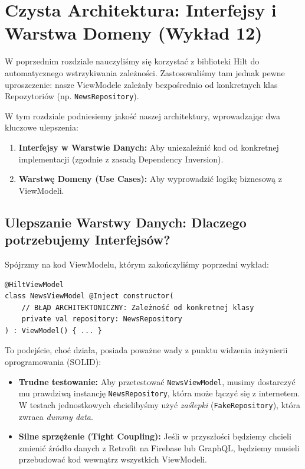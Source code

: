 \chapter{Czysta Architektura: Interfejsy i Warstwa Domeny (Wykład 12)}

W poprzednim rozdziale nauczyliśmy się korzystać z biblioteki Hilt do automatycznego wstrzykiwania zależności. Zastosowaliśmy tam jednak pewne uproszczenie: nasze ViewModele zależały bezpośrednio od konkretnych klas Repozytoriów (np. \texttt{NewsRepository}).

W tym rozdziale podniesiemy jakość naszej architektury, wprowadzając dwa kluczowe ulepszenia:
\begin{enumerate}
    \item \textbf{Interfejsy w Warstwie Danych:} Aby uniezależnić kod od konkretnej implementacji (zgodnie z zasadą Dependency Inversion).
    \item \textbf{Warstwę Domeny (Use Cases):} Aby wyprowadzić logikę biznesową z ViewModeli.
\end{enumerate}

\section{Ulepszanie Warstwy Danych: Dlaczego potrzebujemy Interfejsów?}

Spójrzmy na kod ViewModelu, którym zakończyliśmy poprzedni wykład:

\begin{verbatim}
@HiltViewModel
class NewsViewModel @Inject constructor(
    // BŁĄD ARCHITEKTONICZNY: Zależność od konkretnej klasy
    private val repository: NewsRepository 
) : ViewModel() { ... }
\end{verbatim}

To podejście, choć działa, posiada poważne wady z punktu widzenia inżynierii oprogramowania (SOLID):
\begin{itemize}
    \item \textbf{Trudne testowanie:} Aby przetestować \texttt{NewsViewModel}, musimy dostarczyć mu prawdziwą instancję \texttt{NewsRepository}, która może łączyć się z internetem. W testach jednostkowych chcielibyśmy użyć \textit{zaślepki} (\texttt{FakeRepository}), która zwraca \textit{dummy data}.
    \item \textbf{Silne sprzężenie (Tight Coupling):} Jeśli w przyszłości będziemy chcieli zmienić źródło danych z Retrofit na Firebase lub GraphQL, będziemy musieli przebudować kod wewnątrz wszystkich ViewModeli.
\end{itemize}

